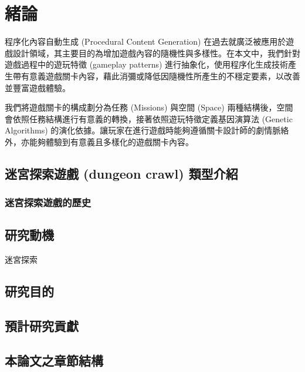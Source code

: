 % 
\chapter{緒論}
\label{cha:intro}

程序化內容自動生成 (Procedural Content Generation) 在過去就廣泛被應用於遊戲設計領域，其主要目的為增加遊戲內容的隨機性與多樣性。在本文中，我們針對遊戲過程中的遊玩特徵 (gameplay patterns) 進行抽象化，使用程序化生成技術產生帶有意義遊戲關卡內容，藉此消彌或降低因隨機性所產生的不穩定要素，以改善並豐富遊戲體驗。

我們將遊戲關卡的構成劃分為任務 (Missions) 與空間 (Space) 兩種結構後，空間會依照任務結構進行有意義的轉換，接著依照遊玩特徵定義基因演算法 (Genetic Algorithms) 的演化依據。讓玩家在進行遊戲時能夠遵循關卡設計師的劇情脈絡外，亦能夠體驗到有意義且多樣化的遊戲關卡內容。

\section{迷宮探索遊戲 (dungeon crawl) 類型介紹}

\subsection{迷宮探索遊戲的歷史}



\section{研究動機}


迷宮探索

\section{研究目的}



\section{預計研究貢獻}



\section{本論文之章節結構}




